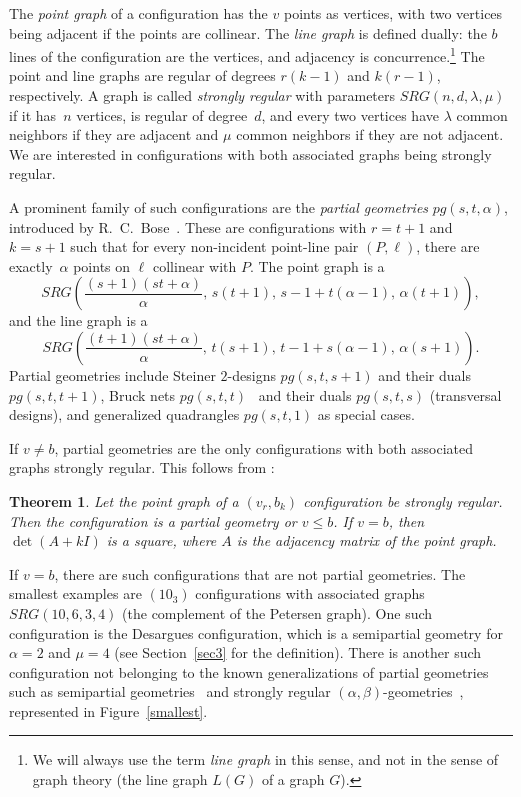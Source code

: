 \documentclass[12pt, reqno]{amsart}
\newtheorem{theorem}{Theorem}[section]
\begin{document}
The \emph{point graph} of a configuration has the $v$ points as vertices, with
two vertices being adjacent if the points are collinear.
The \emph{line graph} is defined dually: the $b$ lines of the configuration are the vertices,
and adjacency is concurrence.\footnote{We will always use the term \emph{line graph} in this sense,
and not in the sense of graph theory (the line graph $L(G)$ of a graph $G$).}
The point and line graphs are regular of degrees $r(k-1)$ and $k(r-1)$, respectively.
A graph is called \emph{strongly regular} with parameters
$SRG(n,d,\lambda,\mu)$ if it has~$n$ vertices, is regular of degree~$d$, and
every two vertices have $\lambda$ common neighbors if
they are adjacent and $\mu$ common neighbors if they are not
adjacent. We are interested in configurations with both associated graphs
being strongly regular.

A prominent family of such configurations are the \emph{partial
geometries} $pg(s,t,\alpha)$, introduced by
R.~C.~Bose~\cite{RCB63}. These are configurations with $r=t+1$ and
$k=s+1$ such that for every non-incident point-line pair $(P,\ell)$,
there are exactly~$\alpha$ points on $\ell$ collinear with $P$. The
point graph is a
\begin{equation}\label{pgpointgraph}
SRG\left(\frac{(s+1)(st+\alpha)}{\alpha},\, s(t+1),\, s-1+t(\alpha-1),\,\alpha(t+1)\right),
\end{equation}
and the line graph is a
\begin{equation}\label{pglinegraph}
SRG\left(\frac{(t+1)(st+\alpha)}{\alpha},\, t(s+1),\, t-1+s(\alpha-1),\, \alpha(s+1)\right).
\end{equation}
Partial geometries include Steiner $2$-designs
$pg(s,t,s+1)$ and their duals $pg(s,t,t+1)$, Bruck nets $pg(s,t,t)$~\cite{RHB51, RHB63}
and their duals $pg(s,t,s)$ (transversal designs), %
and generalized quadrangles $pg(s,t,1)$ as special cases.

If $v\neq b$, partial geometries are the only configurations with both associated graphs strongly regular.
This follows from \cite[Theorem 1.2]{BHT97}:

\begin{theorem}\label{thmBHT}%
Let the point graph of a $(v_r,b_k)$ configuration be strongly regular. Then the configuration is a
partial geometry or $v\le b$. If $v=b$, then $\det(A+k I)$ is a square, where $A$ is
the adjacency matrix of the point graph.
\end{theorem}

If $v=b$, there are such configurations that are not partial geometries. The smallest
examples are $(10_3)$ configurations with associated graphs $SRG(10,6,3,4)$ (the
complement of the Petersen graph). One such configuration is
the Desargues configuration, which is a semipartial geometry for $\alpha=2$ and
$\mu=4$ (see Section~\ref{sec3} for the definition). There is another
such configuration not belonging to the known generalizations of partial geometries
such as semipartial geometries~\cite{DT78,DV95,FDC03} and strongly regular
$(\alpha,\beta)$-geometries~\cite{HM01}, represented in Figure~\ref{smallest}.
\end{document}
